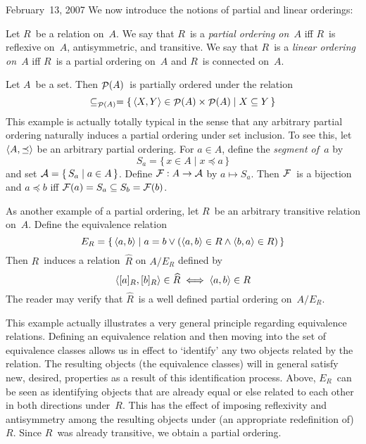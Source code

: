\begin{lecture}{February~13, 2007}
We now introduce the notions of partial and linear orderings:
\begin{defn}
Let \(R\)~be a relation on~\(A\). We say that \(R\)~is a \emph{partial ordering on~\(A\)} iff \(R\)~is reflexive on~\(A\), antisymmetric, and transitive. We say that \(R\)~is a \emph{linear ordering on~\(A\)} iff \(R\)~is a partial ordering on~\(A\) and \(R\)~is connected on~\(A\).
\end{defn}
\begin{example}
Let \(A\)~be a set. Then \(\mathop{\mathcal{P}}(A)\)~is partially ordered under the relation
\[\subseteq_{\mathop{\mathcal{P}}(A)}=\{\,\langle{X},{Y}\rangle\in\mathop{\mathcal{P}}(A)\times\mathop{\mathcal{P}}(A)\mid X\subseteq Y\,\}\]
This example is actually totally typical in the sense that any arbitrary partial ordering naturally induces a partial ordering under set inclusion. To see this, let \(\langle{A},{\preceq}\rangle\) be an arbitrary partial ordering. For \(a\in A\), define the \emph{segment of~\(a\)} by
\[S_a=\{\,x\in A\mid x\preceq a\,\}\]
and set \(\mathcal{A}=\{\,S_a\mid a\in A\,\}\). Define \(\mathcal{F}:A\to\mathcal{A}\) by \(a\mapsto S_a\). Then \(\mathcal{F}\)~is a bijection and \(a\preceq b\) iff \(\mathcal{F}(a)=S_a\subseteq S_b=\mathcal{F}(b)\).
\end{example}
\begin{example}
As another example of a partial ordering, let \(R\)~be an arbitrary transitive relation on~\(A\). Define the equivalence relation
\[E_R=\{\,\langle{a},{b}\rangle\mid a=b\lor(\langle{a},{b}\rangle\in R\land \langle{b},{a}\rangle\in R)\,\}\]
Then \(R\)~induces a relation~\(\widehat{R}\) on \(A/E_R\) defined by
\[\langle{[a]_R},{[b]_R}\rangle\in\widehat{R}\iff \langle{a},{b}\rangle\in R\]
The reader may verify that \(\widehat{R}\)~is a well defined partial ordering on~\(A/E_R\).

This example actually illustrates a very general principle regarding equivalence relations. Defining an equivalence relation and then moving into the set of equivalence classes allows us in effect to `identify' any two objects related by the relation. The resulting objects (the equivalence classes) will in general satisfy new, desired, properties as a result of this identification process. Above, \(E_R\)~can be seen as identifying objects that are already equal or else related to each other in both directions under~\(R\). This has the effect of imposing reflexivity and antisymmetry among the resulting objects under (an appropriate redefinition of)~\(R\). Since \(R\)~was already transitive, we obtain a partial ordering.
\end{example}
\end{lecture}
